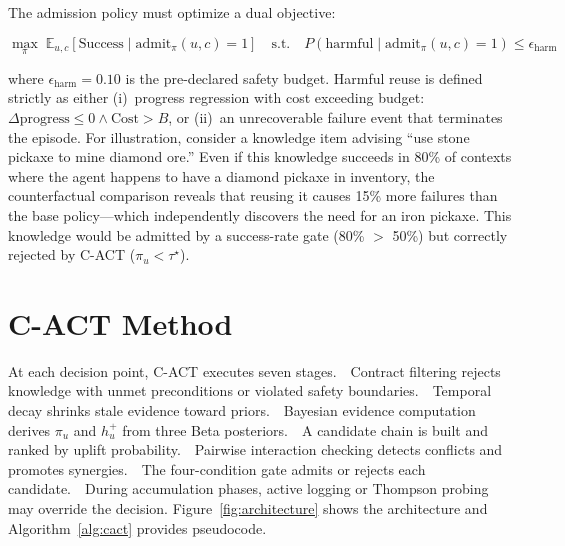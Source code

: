 \documentclass[letterpaper]{article}
\begin{document}
The admission policy must optimize a dual objective:

\begin{equation}
\label{eq:objective}
\max_{\pi} \; \mathbb{E}_{u,c}\left[\text{Success} \mid \text{admit}_\pi(u,c) = 1\right] \quad \text{s.t.} \quad P(\text{harmful} \mid \text{admit}_\pi(u,c) = 1) \leq \epsilon_{\text{harm}}
\end{equation}

where $\epsilon_{\text{harm}} = 0.10$ is the pre-declared safety budget. Harmful reuse is defined strictly as either (i)~progress regression with cost exceeding budget: $\Delta\text{progress} \leq 0 \land \text{Cost} > B$, or (ii)~an unrecoverable failure event that terminates the episode. For illustration, consider a knowledge item advising ``use stone pickaxe to mine diamond ore.'' Even if this knowledge succeeds in 80\% of contexts where the agent happens to have a diamond pickaxe in inventory, the counterfactual comparison reveals that reusing it causes 15\% more failures than the base policy---which independently discovers the need for an iron pickaxe. This knowledge would be admitted by a success-rate gate (80\% $>$ 50\%) but correctly rejected by \textsc{C-ACT} ($\pi_u < \tau^\star$).

\section{\textsc{C-ACT} Method}

At each decision point, \textsc{C-ACT} executes seven stages.~\textbf{}~Contract filtering rejects knowledge with unmet preconditions or violated safety boundaries.~\textbf{}~Temporal decay shrinks stale evidence toward priors.~\textbf{}~Bayesian evidence computation derives $\pi_u$ and $h_u^+$ from three Beta posteriors.~\textbf{}~A candidate chain is built and ranked by uplift probability.~\textbf{}~Pairwise interaction checking detects conflicts and promotes synergies.~\textbf{}~The four-condition gate admits or rejects each candidate.~\textbf{}~During accumulation phases, active logging or Thompson probing may override the decision. Figure~\ref{fig:architecture} shows the architecture and Algorithm~\ref{alg:cact} provides pseudocode.
\end{document}
